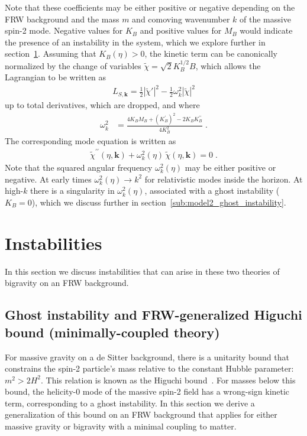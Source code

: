 \documentclass[11pt,a4paper]{article}
\newcommand{\ba}[1]{\begin{align} #1 \end{align}}
\newcommand{\bes}[1]{\begin{equation}\begin{split} #1 \end{split}\end{equation}}
\newcommand{\kvec}{{\bm k}}
\newcommand{\LSk}{L_{S,\kvec}}
\newcommand{\sref}[1]{section~\ref{#1}}
\begin{document}
Note that these coefficients may be either positive or negative depending on the FRW background and the mass $m$ and comoving wavenumber $k$ of the massive spin-2 mode.  Negative values for $K_B$ and positive values for $M_B$ would indicate the presence of an instability in the system, which we explore further in \sref{sec:instabilities}.  Assuming that $K_B(\eta) > 0$, the kinetic term can be canonically normalized by the change of variables $\tilde{\chi} = \sqrt{2} K_B^{1/2} B$, which allows the Lagrangian to be written as 
\ba{\label{eq:nonminvectorfourier}
    \LSk = \frac12 | \tilde{\chi}' |^2 - \frac12 \omega_k^2 | \tilde{\chi} |^2
}
up to total derivatives, which are dropped, and where 
\bes{\label{eq:model2_scalar_omegak}
    \omega_k^2 
    & = \frac{4 K_B M_B + (K_B^\prime)^2 - 2 K_B K_B^{\prime\prime}}{4 K_B^2}
    \;.
}
The corresponding mode equation is written as 
\ba{\label{eq:nonminvecmode}
    \tilde{\chi}^{\prime\prime}(\eta,\kvec) + \omega_k^2(\eta) \, \tilde{\chi}(\eta,\kvec) = 0 
    \;.
}
Note that the squared angular frequency $\omega_k^2(\eta)$ may be either positive or negative.  At early times $\omega_k^2(\eta) \to k^2$ for relativistic modes inside the horizon.  At high-$k$ there is a singularity in $\omega_k^2(\eta)$, associated with a ghost instability ($K_B = 0$), which we discuss further in \sref{sub:model2_ghost_instability}. 

\section{Instabilities}
\label{sec:instabilities}

In this section we discuss instabilities that can arise in these two theories of bigravity on an FRW background.  

\subsection{Ghost instability and FRW-generalized Higuchi bound (minimally-coupled theory)}
\label{sub:ghost_instability}

For massive gravity on a de Sitter background, there is a unitarity bound that constrains the spin-2 particle's mass relative to the constant Hubble parameter: $m^2 > 2 H^2$.  This relation is known as the Higuchi bound~\cite{Higuchi:1986py}.  For masses below this bound, the helicity-0 mode of the massive spin-2 field has a wrong-sign kinetic term, corresponding to a ghost instability.  In this section we derive a generalization of this bound on an FRW background that applies for either massive gravity or bigravity with a minimal coupling to matter.
\end{document}
